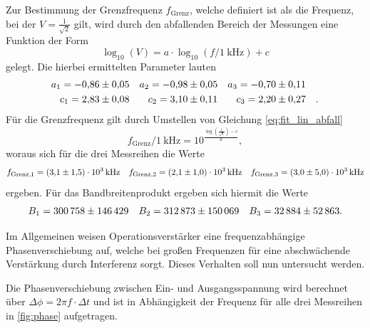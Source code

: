 Zur Bestimmung der Grenzfrequenz $f_\mathrm{Grenz}$, welche definiert ist als die Frequenz, bei der $V = \frac{1}{\sqrt{2}}$ gilt, wird durch den abfallenden Bereich der Messungen eine Funktion der Form
\begin{equation}
  \log_{10} (V) = a \cdot \log_{10} (f/\SI{1}{\kilo\hertz}) + c
  \label{eq:fit_lin_abfall}
\end{equation}
gelegt. Die hierbei ermittelten Parameter lauten
\begin{align*}
  a_1 = \num{-0.86 \pm 0.05} && a_2 = \num{-0.98 \pm 0.05} && a_3 = \num{-0.7 \pm 0.11} && \\
  c_1 = \num{2.83 \pm 0.08} && c_2 = \num{3.1 \pm 0.11} && c_3 = \num{2.2 \pm 0.27} && .
\end{align*}
Für die Grenzfrequenz gilt durch Umstellen von Gleichung \eqref{eq:fit_lin_abfall}
\begin{equation*}
  f_\mathrm{Grenz}/\SI{1}{\kilo\hertz} = 10^{\frac{\log \left(\frac{1}{\sqrt{2}}\right) - c}{a}},
\end{equation*}
woraus sich für die drei Messreihen die Werte
\begin{align*}
  f_{\mathrm{Grenz},1} = \SI{3.1 \pm 1.5 e3}{\kilo\hertz} && f_{\mathrm{Grenz},2} = \SI{2.1 \pm 1.0 e3}{\kilo\hertz} && f_{\mathrm{Grenz},3} = \SI{3.0 \pm 5.0 e3}{\kilo\hertz}
\end{align*}
ergeben.
Für das Bandbreitenprodukt ergeben sich hiermit die Werte
\begin{align*}
  B_1 = \num{300758 \pm 146429} && B_2 = \num{312873 \pm 150069} && B_3 = \num{32884 \pm 52863}.
\end{align*}

Im Allgemeinen weisen Operationsverstärker eine frequenzabhängige Phasenverschiebung auf, welche bei großen Frequenzen für eine abschwächende Verstärkung durch Interferenz sorgt. Dieses Verhalten soll nun untersucht werden.

Die Phasenverschiebung zwischen Ein- und Ausgangsspannung wird berechnet über $\Delta \phi = 2 \pi f \cdot \Delta t$ und ist in Abhängigkeit der Frequenz für alle drei Messreihen in \autoref{fig:phase} aufgetragen.

